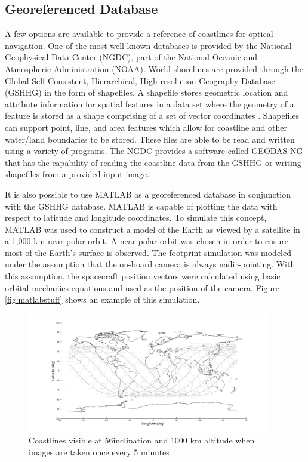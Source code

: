 \documentclass[]{aiaa-tc}%
\begin{document}
\subsection{Georeferenced Database}
A few options are available to provide a reference of coastlines for optical navigation.  One of the most well-known databases is provided by the National Geophysical Data Center (NGDC), part of the National Oceanic and Atmospheric Administration (NOAA).  World shorelines are provided through the Global Self-Consistent, Hierarchical, High-resolution Geography Database (GSHHG) in the form of shapefiles.  A shapefile stores geometric location and attribute information for spatial features in a data set where the geometry of a feature is stored as a shape comprising of a set of vector coordinates \cite{ESRITechDes}.  Shapefiles can support point, line, and area features which allow for coastline and other water/land boundaries to be stored.  These files are able to be read and written using a variety of programs.  The NGDC provides a software called GEODAS-NG that has the capability of reading the coastline data from the GSHHG or writing shapefiles from a provided input image.  

It is also possible to use MATLAB as a georeferenced database in conjunction with the GSHHG database.  MATLAB is capable of plotting the data with respect to latitude and longitude coordinates.  To simulate this concept, MATLAB was used to construct a model of the Earth as viewed by a satellite in a 1,000 km near-polar orbit.  A near-polar orbit was chosen in order to ensure most of the Earth's surface is observed.  The footprint simulation was modeled under the assumption that the on-board camera is always nadir-pointing.  With this assumption, the spacecraft position vectors were calculated using basic orbital mechanics equations and used as the position of the camera.  Figure \ref{fig:matlabstuff} shows an example of this simulation.

\begin{figure}[ht!]
\centering
\includegraphics[width=0.95\textwidth]{ISScoverage} %
\caption{Coastlines visible at 56\degree inclination and 1000 km altitude when images are taken once every 5 minutes}
\label{fig:coverage}
\end{figure}
%
\end{document}
